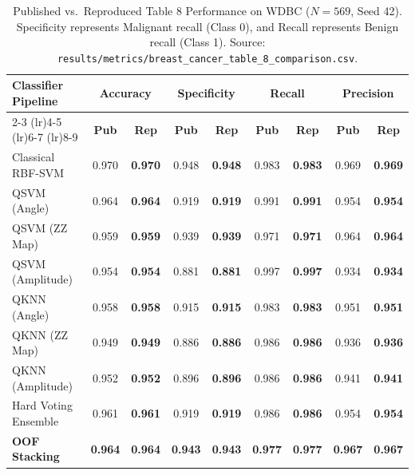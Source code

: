\begin{table}[H]
\centering
\small
\caption{Published vs.\ Reproduced Table 8 Performance on WDBC ($N=569$, Seed 42). Specificity represents Malignant recall (Class 0), and Recall represents Benign recall (Class 1). Source: \texttt{results/metrics/breast\_cancer\_table\_8\_comparison.csv}.}
\label{tab:table8-full-reproduction}
\begin{tabularx}{\textwidth}{lcccccccc}
\toprule
\multirow{2}{*}{\textbf{Classifier Pipeline}} & \multicolumn{2}{c}{\textbf{Accuracy}} & \multicolumn{2}{c}{\textbf{Specificity}} & \multicolumn{2}{c}{\textbf{Recall}} & \multicolumn{2}{c}{\textbf{Precision}} \\
\cmidrule(lr){2-3} \cmidrule(lr){4-5} \cmidrule(lr){6-7} \cmidrule(lr){8-9}
& \textbf{Pub} & \textbf{Rep} & \textbf{Pub} & \textbf{Rep} & \textbf{Pub} & \textbf{Rep} & \textbf{Pub} & \textbf{Rep} \\
\midrule
Classical RBF-SVM     & 0.970 & \textbf{0.970} & 0.948 & \textbf{0.948} & 0.983 & \textbf{0.983} & 0.969 & \textbf{0.969} \\
QSVM (Angle)          & 0.964 & \textbf{0.964} & 0.919 & \textbf{0.919} & 0.991 & \textbf{0.991} & 0.954 & \textbf{0.954} \\
QSVM (ZZ Map)         & 0.959 & \textbf{0.959} & 0.939 & \textbf{0.939} & 0.971 & \textbf{0.971} & 0.964 & \textbf{0.964} \\
QSVM (Amplitude)      & 0.954 & \textbf{0.954} & 0.881 & \textbf{0.881} & 0.997 & \textbf{0.997} & 0.934 & \textbf{0.934} \\
QKNN (Angle)          & 0.958 & \textbf{0.958} & 0.915 & \textbf{0.915} & 0.983 & \textbf{0.983} & 0.951 & \textbf{0.951} \\
QKNN (ZZ Map)         & 0.949 & \textbf{0.949} & 0.886 & \textbf{0.886} & 0.986 & \textbf{0.986} & 0.936 & \textbf{0.936} \\
QKNN (Amplitude)      & 0.952 & \textbf{0.952} & 0.896 & \textbf{0.896} & 0.986 & \textbf{0.986} & 0.941 & \textbf{0.941} \\
Hard Voting Ensemble  & 0.961 & \textbf{0.961} & 0.919 & \textbf{0.919} & 0.986 & \textbf{0.986} & 0.954 & \textbf{0.954} \\
\textbf{OOF Stacking} & \textbf{0.964} & \textbf{0.964} & \textbf{0.943} & \textbf{0.943} & \textbf{0.977} & \textbf{0.977} & \textbf{0.967} & \textbf{0.967} \\
\bottomrule
\end{tabularx}
\end{table}

